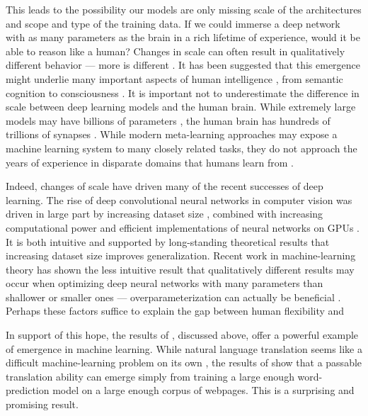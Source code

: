 This leads to the possibility our models are only missing scale of the architectures and scope and type of the training data. If we could immerse a deep network with as many parameters as the brain in a rich lifetime of experience, would it be able to reason like a human? Changes in scale can often result in qualitatively different behavior --- more is different \citep{Anderson1972}. It has been suggested that this emergence might underlie many important aspects of human intelligence \citep{McClelland2010a}, from semantic cognition \citep{Rogers2008, Saxe2019} to consciousness \citep{Chalmers2006}. It is important not to underestimate the difference in scale between deep learning models and the human brain. While extremely large models may have billions of parameters \citep[][e.g.]{Radford2019}, the human brain has hundreds of trillions of synapses \citep{Drachman2005}. While modern meta-learning approaches may expose a machine learning system to many closely related tasks, they do not approach the years of experience in disparate domains that humans learn from \citep{Mitchell2018}.\par 
Indeed, changes of scale have driven many of the recent successes of deep learning. The rise of deep convolutional neural networks in computer vision was driven in large part by increasing dataset size \citep{Deng2009}, combined with increasing computational power and efficient implementations of neural networks on GPUs \citep{Krizhevsky2012}. It is both intuitive and supported by long-standing theoretical results \citep{Bartlett2002} that increasing dataset size improves generalization. Recent work in machine-learning theory has shown the less intuitive result that qualitatively different results may occur when optimizing deep neural networks with many parameters than shallower or smaller ones --- overparameterization can actually be beneficial \citep{Dauphin2014, Arora2018a}. Perhaps these factors suffice to explain the gap between human flexibility and \par 
In support of this hope, the results of \citet{Radford2019}, discussed above, offer a powerful example of emergence in machine learning. While natural language translation seems like a difficult machine-learning problem on its own \citep{Wu2016}, the results of \citet{Radford2019} show that a passable translation ability can emerge simply from training a large enough word-prediction model on a large enough corpus of webpages. This is a surprising and promising result. \par 
